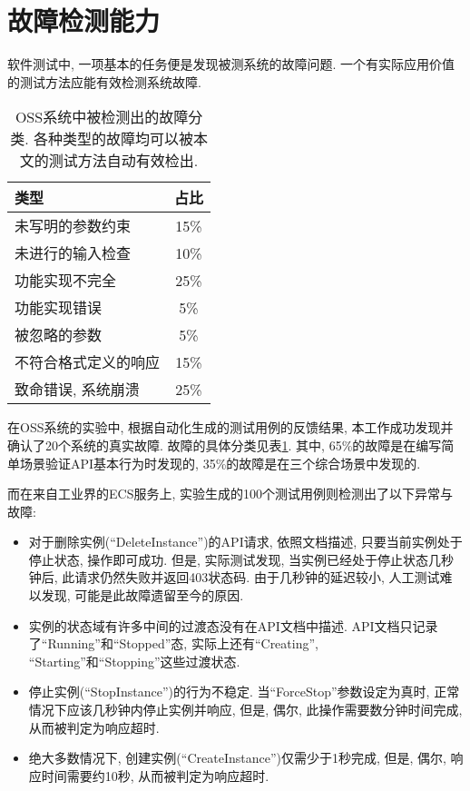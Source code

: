     \section{故障检测能力}
    
        软件测试中, 一项基本的任务便是发现被测系统的故障问题. 一个有实际应用价值的测试方法应能有效检测系统故障.
        
        \begin{table}
            \centering
            \begin{tabular}{lc}
                \toprule
                类型 & 占比 \\
                \midrule
                未写明的参数约束 & 15\% \\
                未进行的输入检查 & 10\% \\
                功能实现不完全 & 25\% \\
                功能实现错误 & 5\% \\
                被忽略的参数 & 5\% \\
                不符合格式定义的响应 & 15\% \\
                致命错误, 系统崩溃 & 25\% \\
                \bottomrule
            \end{tabular}
            \caption{OSS系统中被检测出的故障分类. 各种类型的故障均可以被本文的测试方法自动有效检出.}
            \label{tab:oss_bug_classification}
        \end{table}
        
        在OSS系统的实验中, 根据自动化生成的测试用例的反馈结果, 本工作成功发现并确认了20个系统的真实故障. 故障的具体分类见表\ref{tab:oss_bug_classification}. 其中, 65\%的故障是在编写简单场景验证API基本行为时发现的, 35\%的故障是在三个综合场景中发现的.
        
        而在来自工业界的ECS服务上, 实验生成的100个测试用例则检测出了以下异常与故障:
        \begin{itemize}
            \item 对于删除实例(“DeleteInstance”)的API请求, 依照文档描述, 只要当前实例处于停止状态, 操作即可成功. 但是, 实际测试发现, 当实例已经处于停止状态几秒钟后, 此请求仍然失败并返回403状态码. 由于几秒钟的延迟较小, 人工测试难以发现, 可能是此故障遗留至今的原因.
            
            \item 实例的状态域有许多中间的过渡态没有在API文档中描述. API文档只记录了“Running”和“Stopped”态, 实际上还有“Creating”, “Starting”和“Stopping”这些过渡状态.
            
            \item 停止实例(“StopInstance”)的行为不稳定. 当“ForceStop”参数设定为真时, 正常情况下应该几秒钟内停止实例并响应, 但是, 偶尔, 此操作需要数分钟时间完成, 从而被判定为响应超时.
            
            \item 绝大多数情况下, 创建实例(“CreateInstance”)仅需少于1秒完成, 但是, 偶尔, 响应时间需要约10秒, 从而被判定为响应超时.
        \end{itemize}
        
